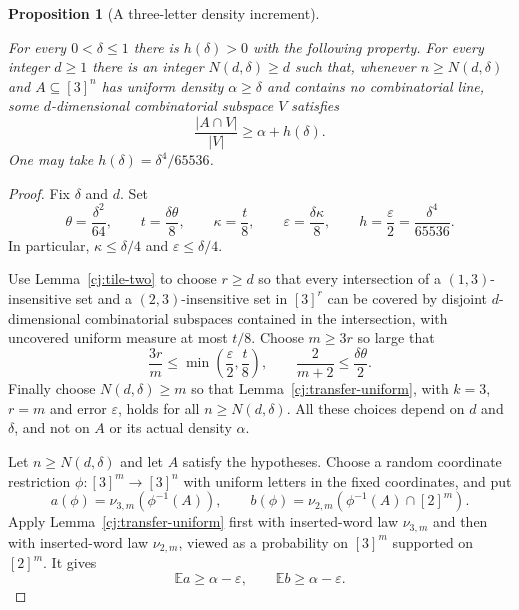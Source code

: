 \documentclass[11pt]{amsart}
\newtheorem{proposition}[theorem]{Proposition}
\theoremstyle{definition}
\theoremstyle{remark}
\numberwithin{equation}{section}
\providecommand{\lean}[1]{}
\providecommand{\leanok}{}
\begin{document}
\begin{proposition}[A three-letter density increment]
\label{cj:density-increment}
\lean{Auto.C_cj_density_increment,Auto.cj_density_increment}
\leanok
For every $0<\delta\le1$ there is $h(\delta)>0$ with the following
property.  For every integer $d\ge1$ there is an integer
$N(d,\delta)\ge d$ such that, whenever $n\ge N(d,\delta)$ and
$A\subseteq[3]^n$ has uniform density $\alpha\ge\delta$ and
contains no combinatorial line, some $d$-dimensional combinatorial
subspace $V$ satisfies
\[
 \frac{|A\cap V|}{|V|}\ge\alpha+h(\delta).
\]
One may take $h(\delta)=\delta^4/65536$.
\end{proposition}
\begin{proof}
Fix $\delta$ and $d$.  Set
\begin{equation}\label{eq:cj-increment-constants}
 \theta=\frac{\delta^2}{64},\qquad
 t=\frac{\delta\theta}{8},\qquad
 \kappa=\frac t8,\qquad
 \varepsilon=\frac{\delta\kappa}{8},\qquad
 h=\frac\varepsilon2=\frac{\delta^4}{65536}.
\end{equation}
In particular, $\kappa\le\delta/4$ and
$\varepsilon\le\delta/4$.

Use Lemma~\ref{cj:tile-two} to choose $r\ge d$ so that every
intersection of a $(1,3)$-insensitive set and a $(2,3)$-insensitive
set in $[3]^r$ can be covered by disjoint $d$-dimensional
combinatorial subspaces contained in the intersection, with uncovered
uniform measure at most $t/8$.  Choose $m\ge3r$ so large that
\begin{equation}\label{eq:cj-dimension-choices}
 \frac{3r}{m}\le\min\left(\frac\varepsilon2,\frac t8\right),
 \qquad
 \frac{2}{m+2}\le\frac{\delta\theta}{2}.
\end{equation}
Finally choose $N(d,\delta)\ge m$ so that
Lemma~\ref{cj:transfer-uniform}, with $k=3$, $r=m$ and error
$\varepsilon$, holds for all $n\ge N(d,\delta)$.
All these choices depend on $d$ and $\delta$, and not on $A$ or
its actual density $\alpha$.

Let $n\ge N(d,\delta)$ and let $A$ satisfy the hypotheses.
Choose a random coordinate restriction $\phi:[3]^m\to[3]^n$
with uniform letters in the fixed coordinates, and put
\[
 a(\phi)=\nu_{3,m}(\phi^{-1}(A)),\qquad
 b(\phi)=\nu_{2,m}(\phi^{-1}(A)\cap[2]^m).
\]
Apply Lemma~\ref{cj:transfer-uniform} first with inserted-word
law $\nu_{3,m}$ and then with inserted-word law $\nu_{2,m}$,
viewed as a probability on $[3]^m$ supported on $[2]^m$.
It gives
\begin{equation}\label{eq:cj-two-averages}
 \mathbb E a\ge\alpha-\varepsilon,
 \qquad
 \mathbb E b\ge\alpha-\varepsilon.
\end{equation}


\end{proof}
\end{document}
